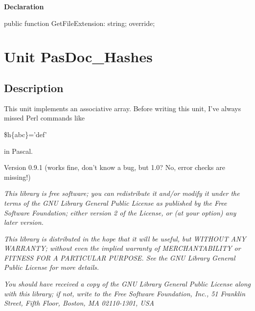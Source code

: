 \documentclass{report}
\newif\ifpdf
\begin{document}
\label{PasDoc_GenSimpleXML.TSimpleXMLDocGenerator-GetFileExtension}
\begin{list}{}{
\setlength{\itemindent}{0cm}
\setlength{\listparindent}{0cm}
\setlength{\leftmargin}{\evensidemargin}
\addtolength{\leftmargin}{\tmplength}
\settowidth{\labelsep}{X}
\addtolength{\leftmargin}{\labelsep}
\setlength{\labelwidth}{\tmplength}
}
\item[\textbf{Declaration}\hfill]
\ifpdf
\begin{flushleft}
\fi
\begin{ttfamily}
public function GetFileExtension: string; override;\end{ttfamily}

\ifpdf
\end{flushleft}
\fi

\end{list}
\chapter{Unit PasDoc{\_}Hashes}
\label{PasDoc_Hashes}
\section{Description}
This unit implements an associative array. Before writing this unit, I've always missed Perl commands like \begin{ttfamily}{\$}h{\{}abc{\}}='def'\end{ttfamily} in Pascal.



Version 0.9.1 (works fine, don't know a bug, but 1.0? No, error checks are missing!)

\textit{ This library is free software; you can redistribute it and/or modify it under the terms of the GNU Library General Public License as published by the Free Software Foundation; either version 2 of the License, or (at your option) any later version.}

\textit{ This library is distributed in the hope that it will be useful, but WITHOUT ANY WARRANTY; without even the implied warranty of MERCHANTABILITY or FITNESS FOR A PARTICULAR PURPOSE. See the GNU Library General Public License for more details.}

\textit{ You should have received a copy of the GNU Library General Public License along with this library; if not, write to the Free Software Foundation, Inc., 51 Franklin Street, Fifth Floor, Boston, MA 02110{-}1301, USA}
\end{document}
